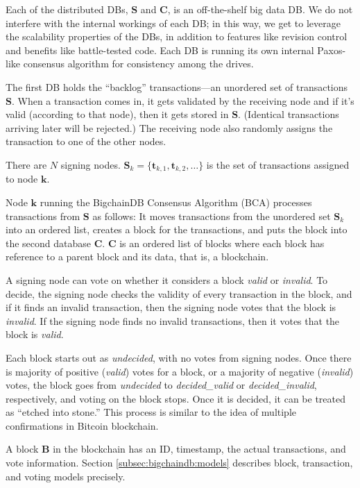 Each of the distributed DBs, $\mathbf{S}$ and $\mathbf{C}$, is an off-the-shelf big data DB.
We do not interfere with the internal workings of each DB; in this way, we get to leverage the scalability properties of the DBs, in addition to features like revision control and benefits like battle-tested code.
Each DB is running its own internal Paxos-like consensus algorithm for consistency among the drives.

The first DB holds the “backlog” transactions---an unordered set of transactions~$\mathbf{S}$.
When a transaction comes in, it gets validated by the receiving node and if it's valid (according to that node), then it gets stored in $\mathbf{S}$. (Identical transactions arriving later will be rejected.) The receiving node also randomly assigns the transaction to one of the other nodes.

There are $N$ signing nodes. $\mathbf{S}_k = \{\mathbf{t}_{k,1}, \mathbf{t}_{k,2}, \dots\}$ is the set of transactions assigned to node $\mathbf{k}$.

Node $\mathbf{k}$ running the BigchainDB Consensus Algorithm (BCA) processes transactions from $\mathbf{S}$ as follows: It moves transactions from the unordered set $\mathbf{S}_k$ into an ordered list, creates a block for the transactions, and puts the block into the second database $\mathbf{C}$.
$\mathbf{C}$ is an ordered list of blocks where each block has reference to a parent block and its data, that is, a blockchain.

A signing node can vote on whether it considers a block \textsf{\textit{valid}} or \textsf{\textit{invalid}}. To decide, the signing node checks the validity of every transaction in the block, and if it finds an invalid transaction, then the signing node votes that the block is \textsf{\textit{invalid}}.
If the signing node finds no invalid transactions, then it votes that the block is \textsf{\textit{valid}}.

Each block starts out as \textsf{\textit{undecided}}, with no votes from signing nodes.
Once there is majority of positive (\textsf{\textit{valid}}) votes for a block, or a majority of negative (\textsf{\textit{invalid}}) votes, the block goes from \textsf{\textit{undecided}} to \textsf{\textit{decided\_valid}} or \textsf{\textit{decided\_invalid}}, respectively, and voting on the block stops.
Once it is decided, it can be treated as “etched into stone.” This process is similar to the idea of multiple confirmations in Bitcoin blockchain.

A block $\mathbf{B}$ in the blockchain has an ID, timestamp, the actual transactions, and vote information. Section \ref{subsec:bigchaindb:models} describes block, transaction, and voting models precisely.

